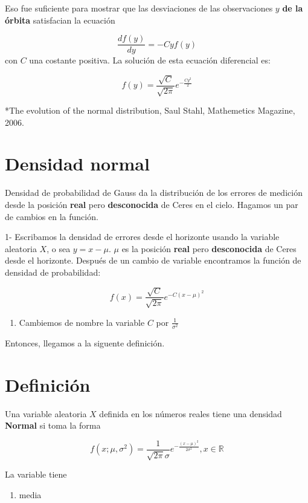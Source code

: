 \documentclass[
]{book}
\providecommand{\tightlist}{%
  \setlength{\itemsep}{0pt}\setlength{\parskip}{0pt}}
\begin{document}
Eso fue suficiente para mostrar que las desviaciones de las observaciones \(y\) \textbf{de la órbita} satisfacian la ecuación

\[\frac{df(y)}{dy}=-Cyf(y)\]
con \(C\) una costante positiva. La solución de esta ecuación diferencial es:

\[f(y)=\frac{\sqrt{C}}{\sqrt{2\pi}}e^{-\frac{Cy^2}{2}}\]

*The evolution of the normal distribution, Saul Stahl, Mathemetics Magazine, 2006.

\hypertarget{densidad-normal}{%
\section{Densidad normal}\label{densidad-normal}}

Densidad de probabilidad de Gauss da la distribución de los errores de medición desde la posición \textbf{real} pero \textbf{desconocida} de Ceres en el cielo. Hagamos un par de cambios en la función.

1- Escribamos la densidad de errores desde el horizonte usando la variable aleatoria \(X\), o sea \(y=x-\mu\). \(\mu\) es la posición \textbf{real} pero \textbf{desconocida} de Ceres desde el horizonte. Después de un cambio de variable encontramos la función de densidad de probabilidad:

\[f(x)=\frac{\sqrt{C}}{\sqrt{2\pi}}e^{-C(x-\mu)^2}\]

\begin{enumerate}
\def\labelenumi{\arabic{enumi})}
\setcounter{enumi}{1}
\tightlist
\item
  Cambiemos de nombre la variable \(C\) por \(\frac{1}{\sigma^2}\)
\end{enumerate}

Entonces, llegamos a la siguente definición.

\hypertarget{definiciuxf3n}{%
\section{Definición}\label{definiciuxf3n}}

Una variable aleatoria \(X\) definida en los números reales tiene una densidad \textbf{Normal} si toma la forma

\[f(x; \mu, \sigma^2)=\frac{1}{\sqrt{2\pi}\sigma}e^{-\frac{(x-\mu)^2}{2\sigma^2}}, x \in {\mathbb R}\]

La variable tiene

\begin{enumerate}
\def\labelenumi{\arabic{enumi})}
\tightlist
\item
  media
\end{enumerate}
\end{document}
